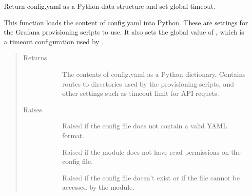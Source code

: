 \documentclass[letterpaper,10pt,english]{sphinxmanual}
\begin{document}

\begin{fulllineitems}
\label{\detokenize{yamlUtility:yamlUtility.loadConfig}}
Return config.yaml as a Python data structure and set global timeout.

This function loads the content of config.yaml into Python. These are settings
for the Grafana provisioning scripts to use. It also sets the global value of
, which is a timeout configuration used by .
\begin{quote}\begin{description}
\item[{Returns}] \leavevmode\begin{description}
\item[{}] \leavevmode{[}\sphinxtitleref{dict}{]}
The contents of config.yaml as a Python dictionary. Contains routes to
directories used by the provisioning scripts, and other settings such as
timeout limit for API requets.

\end{description}

\item[{Raises}] \leavevmode\begin{description}
\item[{}] \leavevmode
Raised if the config file does not contain a valid YAML format.

\item[{}] \leavevmode
Raised if the module does not have read permissions on the config file.

\item[{}] \leavevmode
Raised if the config file doesn’t exist or if the file cannot be accessed
by the module.

\end{description}

\end{description}\end{quote}




{\hyperref[\detokenize{yamlUtility:yamlUtility.getYamlContent}]{}}



\end{fulllineitems}
\end{document}
